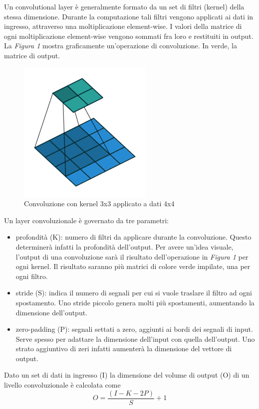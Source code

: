 \documentclass{article}
\begin{document}
Un convolutional layer è generalmente formato da un set di filtri (kernel) della stessa dimensione. Durante la computazione tali filtri vengono applicati ai dati in ingresso, attraverso una moltiplicazione element-wise. I valori della matrice di ogni moltiplicazione element-wise vengono sommati fra loro e restituiti in output.
La \textit{Figura 1} mostra graficamente un'operazione di convoluzione. In verde, la matrice di output.
\begin{figure}[!h]
\centering
\includegraphics[scale=0.7]{convolution}
\caption{Convoluzione con kernel 3x3 applicato a dati 4x4}
\end{figure}

Un layer convoluzionale è governato da tre parametri:
\begin{itemize}
\item profondità (K): numero di filtri da applicare durante la convoluzione. Questo determinerà infatti la profondità dell'output. Per avere un'idea visuale, l'output di una convoluzione sarà il risultato dell'operazione in \textit{Figura 1} per ogni kernel. Il risultato saranno più matrici di colore verde impilate, una per ogni filtro. 
\item stride (S): indica il numero di segnali per cui si vuole traslare il filtro ad ogni spostamento. Uno stride piccolo genera molti più spostamenti, aumentando la dimensione dell'output. 
\item zero-padding (P): segnali settati a zero, aggiunti ai bordi dei segnali di input. Serve spesso per adattare la dimensione dell'input con quella dell'output. Uno strato aggiuntivo di zeri infatti aumenterà la dimensione del vettore di output. 
\end{itemize}

Dato un set di dati in ingresso (I) la dimensione del volume di output (O) di un livello convoluzionale è calcolata come
\begin{equation}
O={\frac{(I - K - 2P)}{S} +1}
\end{equation}
\end{document}
